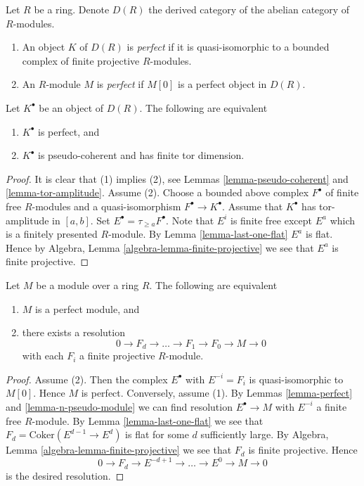 \begin{definition}
\label{definition-perfect}
Let $R$ be a ring. Denote $D(R)$ the derived category of the abelian
category of $R$-modules.
\begin{enumerate}
\item An object $K$ of $D(R)$ is {\it perfect} if it is quasi-isomorphic
to a bounded complex of finite projective $R$-modules.
\item An $R$-module $M$ is {\it perfect} if $M[0]$ is a perfect object
in $D(R)$.
\end{enumerate}
\end{definition}

\begin{lemma}
\label{lemma-perfect}
Let $K^\bullet$ be an object of $D(R)$. The following are equivalent
\begin{enumerate}
\item $K^\bullet$ is perfect, and
\item $K^\bullet$ is pseudo-coherent and has finite tor dimension.
\end{enumerate}
\end{lemma}

\begin{proof}
It is clear that (1) implies (2), see
Lemmas \ref{lemma-pseudo-coherent} and \ref{lemma-tor-amplitude}.
Assume (2). Choose a bounded above complex $F^\bullet$
of finite free $R$-modules and a quasi-isomorphism $F^\bullet \to K^\bullet$.
Assume that $K^\bullet$ has tor-amplitude in $[a, b]$.
Set $E^\bullet = \tau_{\geq a}F^\bullet$. Note that $E^i$ is finite free
except $E^a$ which is a finitely presented $R$-module.
By
Lemma \ref{lemma-last-one-flat}
$E^a$ is flat. Hence by
Algebra, Lemma \ref{algebra-lemma-finite-projective}
we see that $E^a$ is finite projective.
\end{proof}

\begin{lemma}
\label{lemma-perfect-module}
Let $M$ be a module over a ring $R$. The following are equivalent
\begin{enumerate}
\item $M$ is a perfect module, and
\item there exists a resolution
$$
0 \to F_d \to \ldots \to F_1 \to F_0 \to M \to 0
$$
with each $F_i$ a finite projective $R$-module.
\end{enumerate}
\end{lemma}

\begin{proof}
Assume (2). Then the complex $E^\bullet$ with $E^{-i} = F_i$
is quasi-isomorphic to $M[0]$. Hence $M$ is perfect.
Conversely, assume (1). By
Lemmas \ref{lemma-perfect} and \ref{lemma-n-pseudo-module}
we can find resolution $E^\bullet \to M$ with $E^{-i}$ a finite free
$R$-module. By
Lemma \ref{lemma-last-one-flat}
we see that $F_d = \text{Coker}(E^{d - 1} \to E^d)$ is flat for
some $d$ sufficiently large. By
Algebra, Lemma \ref{algebra-lemma-finite-projective}
we see that $F_d$ is finite projective.
Hence
$$
0 \to F_d \to E^{-d+1} \to \ldots \to E^0 \to M \to 0
$$
is the desired resolution.
\end{proof}

